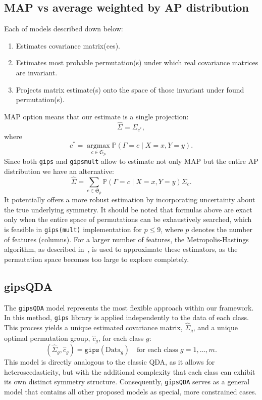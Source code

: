 \documentclass[a4paper,11pt,twoside]{report}
\theoremstyle{definition}
\begin{document}
\subsection{MAP vs average weighted by AP distribution}
Each of models described down below:
\begin{enumerate}
    \item Estimates covariance matrix(ces).
    \item Estimates most probable permutation(s) under which real covariance matrices are invariant.
    \item Projects matrix estimate(s) onto the space of those invariant under found permutation(s).
\end{enumerate}
MAP option means that our estimate is a single projection:
\begin{equation}
    \hat{\Sigma} = \Sigma_{c^*},
\end{equation}
where
\begin{equation}
    c^*=\operatorname*{argmax}_{c \in \mathfrak{S}_p} \mathbb{P}(\Gamma=c \mid X=x, Y=y).
\end{equation}
Since both \texttt{gips} and \texttt{gipsmult} allow to estimate not only MAP but the entire AP distribution we have an alternative:
\begin{equation}
    \hat{\Sigma}=\sum_{c \in \mathfrak{S}_p} \mathbb{P}(\Gamma=c \mid X=x, Y=y) \Sigma_c.
    \label{eq:weighted_avg_estimator}
\end{equation}
It potentially offers a more robust estimation by incorporating uncertainty about the true underlying symmetry.
It should be noted that formulas above  are exact only when the entire space of permutations can be exhaustively searched,
which is feasible in \texttt{gips(mult)} implementation for $p \le 9$, where $p$ denotes the number of features (columns).
For a larger number of features, the Metropolis-Hastings algorithm, as described in~\cite{JSSv112i07},
is used to approximate these estimators, as the permutation space becomes too large to explore completely.

\subsection{gipsQDA}
The \texttt{gipsQDA} model represents the most flexible approach within our framework. In this method, \texttt{gips} library is applied independently to the data of each class. This process yields a unique estimated covariance matrix, $\hat{\Sigma}_g$, and a unique optimal permutation group, $\hat{c}_g$, for each class $g$:
\begin{equation}
    (\hat{\Sigma}_g, \hat{c}_g) = \texttt{gips}(\text{Data}_g) \quad \text{for each class } g=1, \dots, m.
\end{equation}
This model is directly analogous to the classic QDA, as it allows for heteroscedasticity, but with the additional complexity that each class can exhibit its own distinct symmetry structure. Consequently, \texttt{gipsQDA} serves as a general model that contains all other proposed models as special, more constrained cases.
\end{document}
